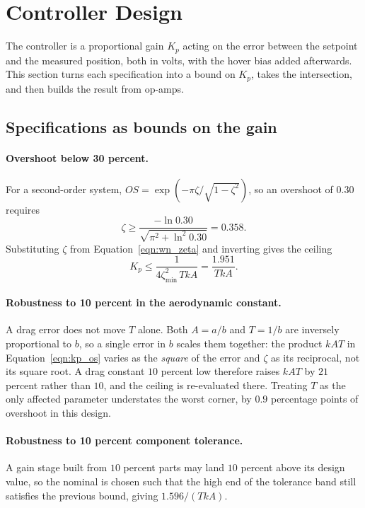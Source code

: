 \section{Controller Design}\label{sec:design}
The controller is a proportional gain $K_p$ acting on the error between the setpoint and the
measured position, both in volts, with the hover bias added afterwards. This section turns each
specification into a bound on $K_p$, takes the intersection, and then builds the result from
op-amps.

\subsection{Specifications as bounds on the gain}
\paragraph{Overshoot below 30 percent.} For a second-order system,
$OS = \exp\!\left(-\pi\zeta/\sqrt{1-\zeta^2}\right)$, so an overshoot of $0.30$ requires
\begin{equation}
    \zeta \geq \frac{-\ln 0.30}{\sqrt{\pi^2 + \ln^2 0.30}} = 0.358 .
\end{equation}
Substituting $\zeta$ from Equation~\eqref{eqn:wn_zeta} and inverting gives the ceiling
\begin{equation}\label{eqn:kp_os}
    K_p \leq \frac{1}{4\zeta_{\min}^2\,T k A} = \frac{1.951}{T k A} .
\end{equation}

\paragraph{Robustness to 10 percent in the aerodynamic constant.} A drag error does not move $T$
alone. Both $A = a/b$ and $T = 1/b$ are inversely proportional to $b$, so a single error in $b$
scales them together: the product $kAT$ in Equation~\eqref{eqn:kp_os} varies as the \emph{square}
of the error and $\zeta$ as its reciprocal, not its square root. A drag constant $10$ percent low
therefore raises $kAT$ by $21$ percent rather than $10$, and the ceiling is re-evaluated there.
Treating $T$ as the only affected parameter understates the worst corner, by $0.9$ percentage
points of overshoot in this design.

\paragraph{Robustness to 10 percent component tolerance.} A gain stage built from $10$ percent
parts may land $10$ percent above its design value, so the nominal is chosen such that the high
end of the tolerance band still satisfies the previous bound, giving $1.596/(TkA)$.

